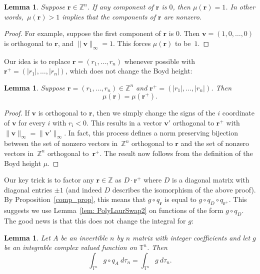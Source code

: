 \documentclass[12pt]{amsart}
\theoremstyle{plain}
\newtheorem{lemma}[theorem]{Lemma}
\theoremstyle{definition}
\theoremstyle{remark}
\numberwithin{theorem}{section}
\numberwithin{equation}{section} %
\newcommand{\bZ}{{\mathbb{Z}}}
\newcommand{\mb}{\mathbf}
\newcommand{\torus}{{\mathbb{T}}}
\begin{document}
\begin{lemma}\label{one_lemma}
Suppose $\mb r \in \bZ^n$. If any component of $\mb r$ is $0$, then $\mu(\mb r) = 1$. In other words,~$\mu(\mb r) >1$
implies that the components of $\mb r$ are nonzero.
\end{lemma}

\begin{proof}
For example, suppose the first component of $\mb r$ is $0$. Then $\mb v = (1, 0, \ldots, 0)$ is orthogonal to $\mb r$, and $\| \mb  v\|_\infty = 1$.
This forces $\mu(\mb r)$ to be~$1$.
\end{proof}

Our idea is to replace $\mb r = (r_1, \ldots, r_n)$ whenever possible with $\mb r^+ = \left( |r_1|, \ldots, |r_n| \right)$, which does not change the Boyd height:

\begin{lemma} \label{same_mu}
Suppose $\mb r = (r_1, \ldots, r_n) \in \bZ^n$ and $\mb r^+ = \left( |r_1|, \ldots, |r_n| \right)$. Then 
$$
\mu \left( \mb r \right)
=
\mu \left( \mb r^+ \right).
$$
\end{lemma}

\begin{proof}
If $\mb v$ is orthogonal to $\mb r$, then we simply change the signs of the $i$ coordinate of $\mb v$ for every $i$ with $r_i < 0$. This results in a vector $\mb v'$ orthogonal to $\mb r^+$ with $\|\mb v\|_\infty= \|\mb v'\|_\infty$.
In fact, this process defines a norm preserving bijection between the set of nonzero vectors in~$\bZ^n$ orthogonal to $\mb r$ and the set of nonzero vectors in~$\bZ^n$ orthogonal to~$\mb r^+$.
The result now follows from the definition of the Boyd height $\mu$.
\end{proof}

Our key trick is to factor any $\mb r \in \bZ$ as $D \cdot \mb r^+$ where $D$ is a diagonal matrix with diagonal entries $\pm 1$ (and indeed $D$ describes the isomorphism of the above proof).
By Proposition~\ref{comp_prop}, this means that $g \circ q_{\mb r}$ is equal to $g \circ q_D \circ  q_{\mb r^+}$.
This suggests we use Lemma~\ref{lem: PolyLaurSwap2} on functions of the form $g \circ q_D$. The good news is that this does not change the integral for $g$:




\begin{lemma}\label{invariance_lemma2}
Let $A$ be an invertible $n$ by $n$ matrix with integer coefficients and let $g$ be an integrable complex valued function on $\torus^n$.
Then
$$
 \int_{\torus^n} g\circ q_A \ d \tau_n =  \int_{\torus^n} g \ d \tau_n.
$$
\end{lemma}
\end{document}
